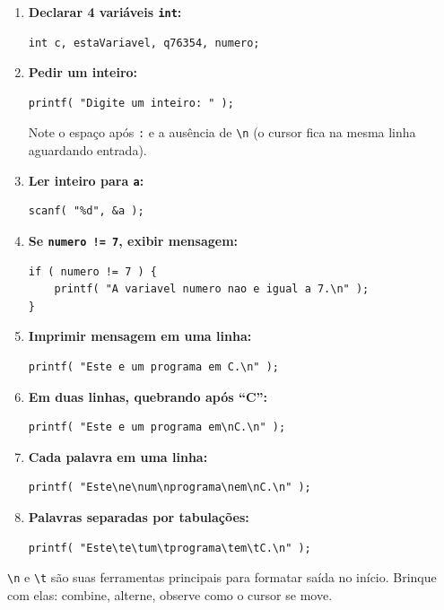 \documentclass[12pt,a4paper]{article}
\begin{document}
\begin{respostabox}
\begin{enumerate}[label=\textbf{\alph*)}]

\item \textbf{Declarar 4 variáveis \texttt{int}:}
\begin{lstlisting}
int c, estaVariavel, q76354, numero;
\end{lstlisting}

\item \textbf{Pedir um inteiro:}
\begin{lstlisting}
printf( "Digite um inteiro: " );
\end{lstlisting}
Note o espaço após \texttt{:} e a ausência de \texttt{\textbackslash n} (o cursor
fica na mesma linha aguardando entrada).

\item \textbf{Ler inteiro para \texttt{a}:}
\begin{lstlisting}
scanf( "%d", &a );
\end{lstlisting}

\item \textbf{Se \texttt{numero != 7}, exibir mensagem:}
\begin{lstlisting}
if ( numero != 7 ) {
    printf( "A variavel numero nao e igual a 7.\n" );
}
\end{lstlisting}

\item \textbf{Imprimir mensagem em uma linha:}
\begin{lstlisting}
printf( "Este e um programa em C.\n" );
\end{lstlisting}

\item \textbf{Em duas linhas, quebrando após ``C'':}
\begin{lstlisting}
printf( "Este e um programa em\nC.\n" );
\end{lstlisting}

\item \textbf{Cada palavra em uma linha:}
\begin{lstlisting}
printf( "Este\ne\num\nprograma\nem\nC.\n" );
\end{lstlisting}

\item \textbf{Palavras separadas por tabulações:}
\begin{lstlisting}
printf( "Este\te\tum\tprograma\tem\tC.\n" );
\end{lstlisting}

\end{enumerate}

\begin{boaprática}
  \texttt{\textbackslash n} e \texttt{\textbackslash t} são suas ferramentas
  principais para formatar saída no início. Brinque com elas: combine, alterne,
  observe como o cursor se move.
\end{boaprática}
\end{respostabox}
\end{document}
